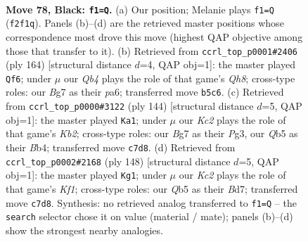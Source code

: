 \documentclass[11pt]{article}
\begin{document}
\clearpage

\begin{figure}[p]\centering
\begin{subfigure}{0.46\textwidth}\centering
\resizebox{\linewidth}{!}{%
\newchessgame
\chessboard[
  setfen={8/2k3b1/8/1q6/6K1/8/5p2/8 b - - 1 78},
  showmover=false,
  pgfstyle=straightmove, color=movearrow, markmove={f2-f1}
]}
\caption{}
\end{subfigure}\hfill
\begin{subfigure}{0.46\textwidth}\centering
\resizebox{\linewidth}{!}{%
\newchessgame
\chessboard[
  setfen={7Q/2k5/p5K1/8/8/8/8/8 w - - 1 83},
  showmover=false,
  pgfstyle=straightmove, color=movearrow, markmove={h8-f6}
]}
\caption{}
\end{subfigure}
\\[4pt]
\begin{subfigure}{0.46\textwidth}\centering
\resizebox{\linewidth}{!}{%
\newchessgame
\chessboard[
  setfen={4k3/8/6p1/8/1B4b1/6P1/1K6/8 w - - 19 73},
  showmover=false,
  pgfstyle=straightmove, color=movearrow, markmove={b2-a1}
]}
\caption{}
\end{subfigure}\hfill
\begin{subfigure}{0.46\textwidth}\centering
\resizebox{\linewidth}{!}{%
\newchessgame
\chessboard[
  setfen={8/3B4/8/8/1p5k/1P6/8/2b2K2 w - - 12 75},
  showmover=false,
  pgfstyle=straightmove, color=movearrow, markmove={f1-g1}
]}
\caption{}
\end{subfigure}
\caption{\textbf{Move 78, Black: \texttt{f1=Q}.} (a) Our position; Melanie plays \texttt{f1=Q} (\texttt{f2f1q}). Panels (b)--(d) are the retrieved master positions whose correspondence most drove this move (highest QAP objective among those that transfer to it). (b) Retrieved from \texttt{ccrl\_top\_p0001\#2406} (ply 164) [structural distance $d$=4, QAP obj=1]: the master played \texttt{Qf6}; under $\mu$ our \emph{Qb4} plays the role of that game's \emph{Qh8}; cross-type roles: our \emph{B}g7 as their \emph{p}a6; transferred move \texttt{b5c6}. (c) Retrieved from \texttt{ccrl\_top\_p0000\#3122} (ply 144) [structural distance $d$=5, QAP obj=1]: the master played \texttt{Ka1}; under $\mu$ our \emph{Kc2} plays the role of that game's \emph{Kb2}; cross-type roles: our \emph{B}g7 as their \emph{P}g3, our \emph{Q}b5 as their \emph{B}b4; transferred move \texttt{c7d8}. (d) Retrieved from \texttt{ccrl\_top\_p0002\#2168} (ply 148) [structural distance $d$=5, QAP obj=1]: the master played \texttt{Kg1}; under $\mu$ our \emph{Kc2} plays the role of that game's \emph{Kf1}; cross-type roles: our \emph{Q}b5 as their \emph{B}d7; transferred move \texttt{c7d8}. Synthesis: no retrieved analog transferred to \texttt{f1=Q} -- the \texttt{search} selector chose it on value (material / mate); panels (b)--(d) show the strongest nearby analogies.}
\label{fig:thought-m155}
\end{figure}
\end{document}
